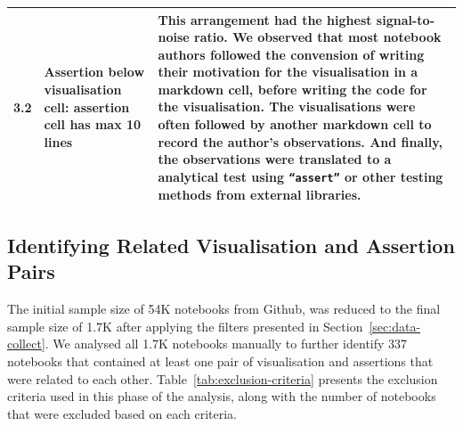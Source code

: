 \documentclass[acmsmall,screen,review,anonymous]{acmart}
\begin{document}
\begin{table}
\begin{tabular}{l p{} p{}}
    3.2 &
    Assertion below visualisation cell: assertion cell has max 10 lines &
    This arrangement had the highest signal-to-noise ratio. We observed that most notebook authors followed the convension of writing their motivation for the visualisation in a markdown cell, before writing the code for the visualisation. The visualisations were often followed by another markdown cell to record the author's observations. And finally, the observations were translated to a analytical test using \texttt{``assert''} or other testing methods from external libraries.\\
    \bottomrule
  \end{tabular}
  \label{tab:cell-arrangement}
\end{table}

\subsection{Identifying Related Visualisation and Assertion Pairs}\label{sec:identify-related-pairs}

The initial sample size of 54K notebooks from Github, was reduced to the final sample size of 1.7K after applying the filters presented in Section~\ref{sec:data-collect}. We analysed all 1.7K notebooks manually to further identify 337 notebooks that contained at least one pair of visualisation and assertions that were related to each other. Table~\ref{tab:exclusion-criteria} presents the exclusion criteria used in this phase of the analysis, along with the number of notebooks that were excluded based on each criteria.
\end{document}

